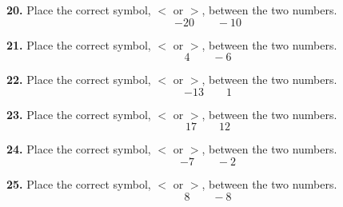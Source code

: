 \documentclass{ximera}
\begin{document}
\begin{problem}
\textbf{20.} Place the correct symbol, $<$ or $>$, between the two numbers.
\[
-20 \qquad -10
\]

\begin{multipleChoice}
\end{multipleChoice}
\end{problem}

\begin{problem}
\textbf{21.} Place the correct symbol, $<$ or $>$, between the two numbers.
\[
4 \qquad -6
\]

\begin{multipleChoice}
\end{multipleChoice}
\end{problem}

\begin{problem}
\textbf{22.} Place the correct symbol, $<$ or $>$, between the two numbers.
\[
-13 \qquad 1
\]

\begin{multipleChoice}
\end{multipleChoice}
\end{problem}

\begin{problem}
\textbf{23.} Place the correct symbol, $<$ or $>$, between the two numbers.
\[
17 \qquad 12
\]

\begin{multipleChoice}
\end{multipleChoice}
\end{problem}

\begin{problem}
\textbf{24.} Place the correct symbol, $<$ or $>$, between the two numbers.
\[
-7 \qquad -2
\]

\begin{multipleChoice}
\end{multipleChoice}
\end{problem}

\begin{problem}
\textbf{25.} Place the correct symbol, $<$ or $>$, between the two numbers.
\[
8 \qquad -8
\]

\begin{multipleChoice}
\end{multipleChoice}
\end{problem}
\end{document}
